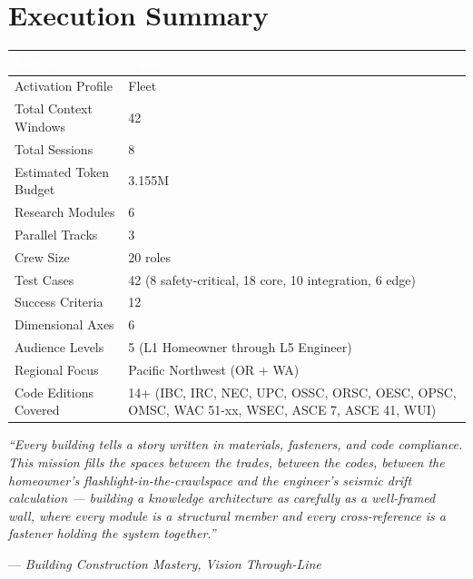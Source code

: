 \documentclass[11pt,letterpaper]{article}
\newcommand{\tableheader}[1]{\textbf{\sffamily\textcolor{white}{#1}}}
\begin{document}
\section{Execution Summary}

\begin{center}
\begin{tabularx}{\textwidth}{L{5cm}X}
\toprule
{}
\tableheader{Metric} & \tableheader{Value} \\
\midrule
Activation Profile & Fleet \\
Total Context Windows & 42 \\
Total Sessions & 8 \\
Estimated Token Budget & 3.155M \\
Research Modules & 6 \\
Parallel Tracks & 3 \\
Crew Size & 20 roles \\
Test Cases & 42 (8 safety-critical, 18 core, 10 integration, 6 edge) \\
Success Criteria & 12 \\
Dimensional Axes & 6 \\
Audience Levels & 5 (L1 Homeowner through L5 Engineer) \\
Regional Focus & Pacific Northwest (OR + WA) \\
Code Editions Covered & 14+ (IBC, IRC, NEC, UPC, OSSC, ORSC, OESC, OPSC, OMSC, WAC 51-xx, WSEC, ASCE 7, ASCE 41, WUI) \\
\bottomrule
\end{tabularx}
\end{center}

\vspace{1em}

\begin{quotebox}
\textit{``Every building tells a story written in materials, fasteners, and code compliance. This mission fills the spaces between the trades, between the codes, between the homeowner's flashlight-in-the-crawlspace and the engineer's seismic drift calculation --- building a knowledge architecture as carefully as a well-framed wall, where every module is a structural member and every cross-reference is a fastener holding the system together.''}

\vspace{0.5em}
\hfill --- \textit{Building Construction Mastery, Vision Through-Line}
\end{quotebox}
\end{document}
